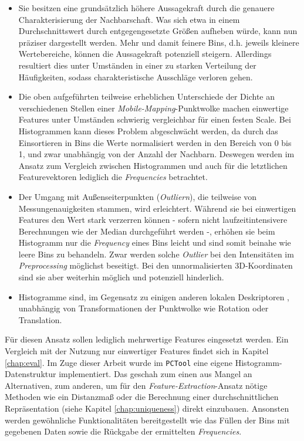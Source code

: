 \begin{itemize}
    \item Sie besitzen eine grundsätzlich höhere Aussagekraft durch die genauere Charakterisierung der Nachbarschaft. Was sich etwa in einem Durchschnittswert durch entgegengesetzte Größen aufheben würde, kann nun präziser dargestellt werden. Mehr und damit feinere Bins, d.h. jeweils kleinere Wertebereiche, können die Aussagekraft potenziell steigern. Allerdings resultiert dies unter Umständen in einer zu starken Verteilung der Häufigkeiten, sodass charakteristische Ausschläge verloren gehen.
    \item Die oben aufgeführten teilweise erheblichen Unterschiede der Dichte an verschiedenen Stellen einer \textit{Mobile-Mapping}-Punktwolke machen einwertige Features unter Umständen schwierig vergleichbar für einen festen Scale. Bei Histogrammen kann dieses Problem abgeschwächt werden, da durch das Einsortieren in Bins die Werte normalisiert werden in den Bereich von 0 bis 1, und zwar unabhängig von der Anzahl der Nachbarn. Deswegen werden im Ansatz zum Vergleich zwischen Histogrammen und auch für die letztlichen Featurevektoren lediglich die \textit{Frequencies} betrachtet.
    \item Der Umgang mit Außenseiterpunkten (\textit{Outliern}), die teilweise von Messungenauigkeiten stammen, wird erleichtert. Während sie bei einwertigen Features den Wert stark verzerren können - sofern nicht laufzeitintensivere Berechnungen wie der Median durchgeführt werden -, erhöhen sie beim Histogramm nur die \textit{Frequency} eines Bins leicht und sind somit beinahe wie leere Bins zu behandeln. Zwar werden solche \textit{Outlier} bei den Intensitäten im \textit{Preprocessing} möglichst beseitigt. Bei den unnormalisierten 3D-Koordinaten sind sie aber weiterhin möglich und potenziell hinderlich.
    \item Histogramme sind, im Gegensatz zu einigen anderen lokalen Deskriptoren \citep{Han.etal-2018}, unabhängig von Transformationen der Punktwolke wie Rotation oder Translation.
\end{itemize}
Für diesen Ansatz sollen lediglich mehrwertige Features eingesetzt werden. Ein Vergleich mit der Nutzung nur einwertiger Features findet sich in Kapitel \ref{chap:eval}.
Im Zuge dieser Arbeit wurde im \texttt{PCTool} eine eigene Histogramm-Datenstruktur implementiert. Das geschah zum einen aus Mangel an Alternativen, zum anderen, um für den \textit{Feature-Extraction}-Ansatz nötige Methoden wie ein Distanzmaß oder die Berechnung einer durchschnittlichen Repräsentation (siehe Kapitel \ref{chap:uniqueness}) direkt einzubauen. Ansonsten werden gewöhnliche Funktionalitäten bereitgestellt wie das Füllen der Bins mit gegebenen Daten sowie die Rückgabe der ermittelten \textit{Frequencies}. \\
